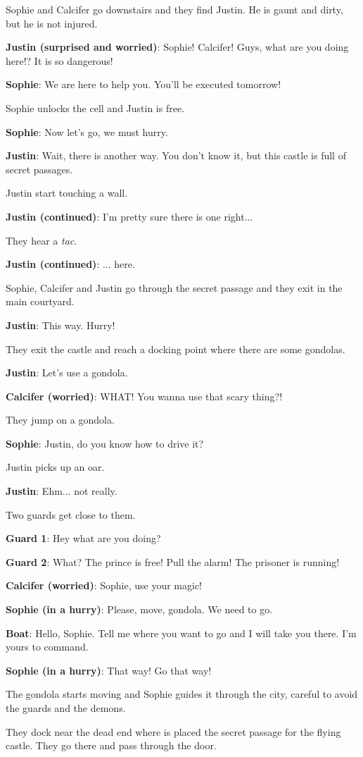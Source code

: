 
Sophie and Calcifer go downstairs and they find Justin. He is gaunt and dirty, but he is not injured.

\textbf{Justin (surprised and worried)}: Sophie! Calcifer! Guys, what are you doing here!? It is so dangerous!

\textbf{Sophie}: We are here to help you. You'll be executed tomorrow!

Sophie unlocks the cell and Justin is free.

\textbf{Sophie}: Now let's go, we must hurry.

\textbf{Justin}: Wait, there is another way. You don't know it, but this castle is full of secret passages.

Justin start touching a wall.

\textbf{Justin (continued)}: I'm pretty sure there is one right...

They hear a \textit{tac}.

\textbf{Justin (continued)}: ... here.

Sophie, Calcifer and Justin go through the secret passage and they exit in the main courtyard.

\textbf{Justin}: This way. Hurry! 

They exit the castle and reach a docking point where there are some gondolas.

\textbf{Justin}: Let's use a gondola.

\textbf{Calcifer (worried)}: WHAT! You wanna use that scary thing?!

They jump on a gondola.

\textbf{Sophie}: Justin, do you know how to drive it?

Justin picks up an oar.

\textbf{Justin}: Ehm... not really.

Two guards get close to them.

\textbf{Guard 1}: Hey what are you doing?

\textbf{Guard 2}: What? The prince is free! Pull the alarm! The prisoner is running!

\textbf{Calcifer (worried)}: Sophie, use your magic!

\textbf{Sophie (in a hurry)}: Please, move, gondola. We need to go.

\textbf{Boat}: Hello, Sophie. Tell me where you want to go and I will take you there. I’m yours to command.

\textbf{Sophie (in a hurry)}: That way! Go that way!

The gondola starts moving and Sophie guides it through the city, careful to avoid the guards and the demons.

They dock near the dead end where is placed the secret passage for the flying castle. They go there and pass through the door.
